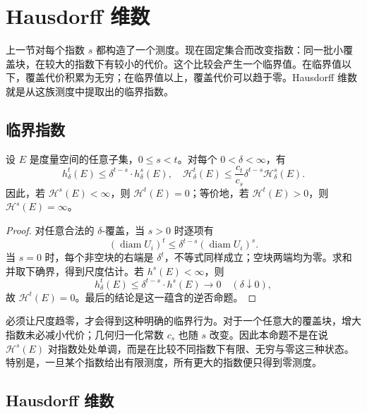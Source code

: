 \section{Hausdorff 维数}
\label{b1:sec:1502}

上一节对每个指数 \(s\) 都构造了一个测度。现在固定集合而改变指数：同一批小覆盖块，在较大的指数下有较小的代价。这个比较会产生一个临界值。在临界值以下，覆盖代价积累为无穷；在临界值以上，覆盖代价可以趋于零。Hausdorff 维数就是从这族测度中提取出的临界指数。


\subsection{临界指数}
\label{b1:subsec:150201}

\begin{proposition}
\label{b1:prop:hausdorff-critical-exponent}
设 \(E\) 是度量空间的任意子集，\(0\leq s<t\)。对每个 \(0<\delta<\infty\)，有
\[
h^t_\delta(E)\leq\delta^{t-s}\cdot h^s_\delta(E),
\quad
\mathcal H^t_\delta(E)
\leq\frac{c_t}{c_s}\delta^{t-s}\mathcal H^s_\delta(E).
\]
因此，若 \(\mathcal H^s(E)<\infty\)，则 \(\mathcal H^t(E)=0\)；等价地，若 \(\mathcal H^t(E)>0\)，则 \(\mathcal H^s(E)=\infty\)。
\end{proposition}
\begin{proof}
对任意合法的 \(\delta\)-覆盖，当 \(s>0\) 时逐项有
\[
(\operatorname{diam}U_i)^t
\leq\delta^{t-s}(\operatorname{diam}U_i)^s.
\]
当 \(s=0\) 时，每个非空块的右端是 \(\delta^t\)，不等式同样成立；空块两端均为零。求和并取下确界，得到尺度估计。若 \(h^s(E)<\infty\)，则
\[
h^t_\delta(E)\leq\delta^{t-s}\cdot h^s(E)\longrightarrow0
\quad(\delta\downarrow0),
\]
故 \(\mathcal H^t(E)=0\)。最后的结论是这一蕴含的逆否命题。
\end{proof}

必须让尺度趋零，才会得到这种明确的临界行为。对于一个任意大的覆盖块，增大指数未必减小代价；几何归一化常数 \(c_s\) 也随 \(s\) 改变。因此本命题不是在说 \(\mathcal H^s(E)\) 对指数处处单调，而是在比较不同指数下有限、无穷与零这三种状态。特别是，一旦某个指数给出有限测度，所有更大的指数便只得到零测度。

\subsection{Hausdorff 维数}
\label{b1:subsec:150202}

